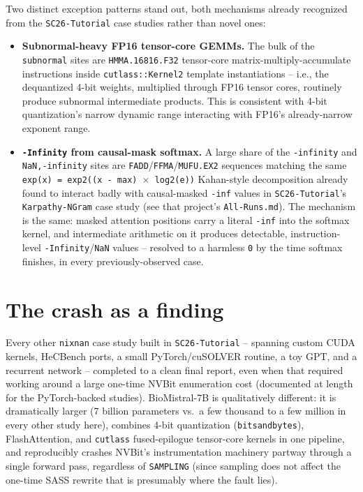 \documentclass[11pt]{article}
\begin{document}
Two distinct exception patterns stand out, both mechanisms already
recognized from the \texttt{SC26-Tutorial} case studies rather than
novel ones:

\begin{itemize}
  \item \textbf{Subnormal-heavy FP16 tensor-core GEMMs.} The bulk of the
    \texttt{subnormal} sites are \texttt{HMMA.16816.F32} tensor-core
    matrix-multiply-accumulate instructions inside
    \texttt{cutlass::Kernel2} template instantiations -- i.e., the
    dequantized 4-bit weights, multiplied through FP16 tensor cores,
    routinely produce subnormal intermediate products. This is consistent
    with 4-bit quantization's narrow dynamic range interacting with FP16's
    already-narrow exponent range.
  \item \textbf{\texttt{-Infinity} from causal-mask softmax.} A large share
    of the \texttt{-infinity} and \texttt{NaN,-infinity} sites are
    \texttt{FADD}/\texttt{FFMA}/\texttt{MUFU.EX2} sequences matching the
    same \texttt{exp(x) = exp2((x - max) \(\times\) log2(e))} Kahan-style
    decomposition already found to interact badly with causal-masked
    \texttt{-inf} values in \texttt{SC26-Tutorial}'s
    \texttt{Karpathy-NGram} case study (see that project's
    \texttt{All-Runs.md}). The mechanism is the same: masked attention
    positions carry a literal \texttt{-inf} into the softmax kernel, and
    intermediate arithmetic on it produces detectable, instruction-level
    \texttt{-Infinity}/\texttt{NaN} values -- resolved to a harmless
    \texttt{0} by the time softmax finishes, in every previously-observed
    case.
\end{itemize}

\section{The crash as a finding}

Every other \texttt{nixnan} case study built in \texttt{SC26-Tutorial} --
spanning custom CUDA kernels, HeCBench ports, a small PyTorch/cuSOLVER
routine, a toy GPT, and a recurrent network -- completed to a clean final
report, even when that required working around a large one-time NVBit
enumeration cost (documented at length for the PyTorch-backed studies).
BioMistral-7B is qualitatively different: it is dramatically larger (7
billion parameters vs.\ a few thousand to a few million in every other
study here), combines 4-bit quantization (\texttt{bitsandbytes}), FlashAttention,
and \texttt{cutlass} fused-epilogue tensor-core kernels in one pipeline, and
reproducibly crashes NVBit's instrumentation machinery partway through a
single forward pass, regardless of \texttt{SAMPLING} (since sampling does
not affect the one-time SASS rewrite that is presumably where the fault
lies).
\end{document}
